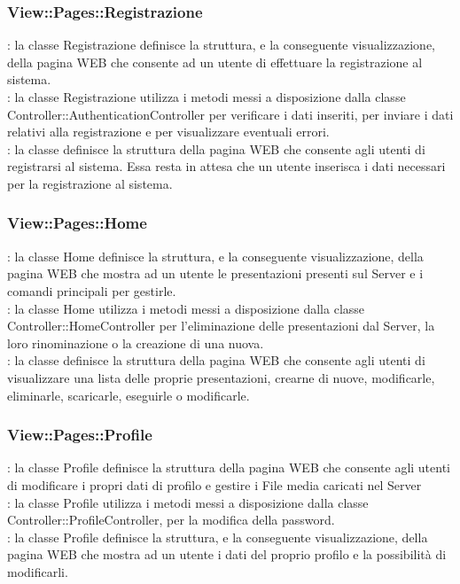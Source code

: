 {{		\subsubsection{View::\-Pages::\-Registrazione}{
			\textbf{\tipo}: la classe Registrazione definisce la struttura, e la conseguente visualizzazione, della pagina WEB che consente ad un utente di effettuare la registrazione al sistema.\\
			\textbf{\relaz}: la classe Registrazione utilizza i metodi messi a disposizione dalla classe Controller::\-AuthenticationController per verificare i dati inseriti, per inviare i dati relativi alla registrazione e per visualizzare eventuali errori.\\
			\textbf{\attivita}: la classe definisce la struttura della pagina WEB che consente agli utenti di registrarsi al sistema. Essa resta in attesa che un utente inserisca i dati necessari per la registrazione al sistema.
		}
		\subsubsection{View::\-Pages::\-Home}{
			\textbf{\tipo}: la classe Home definisce la struttura, e la conseguente visualizzazione, della pagina WEB che mostra ad un utente le presentazioni presenti sul Server e i comandi principali per gestirle.\\	
			\textbf{\relaz}: la classe Home utilizza i metodi messi a disposizione dalla classe Controller::\-HomeController per l'eliminazione delle presentazioni dal Server, la loro rinominazione o la creazione di una nuova.\\
			\textbf{\attivita}: la classe definisce la struttura della pagina WEB che consente agli utenti di visualizzare una lista delle proprie presentazioni, crearne di nuove, modificarle, eliminarle, scaricarle, eseguirle o modificarle.
		}
		\subsubsection{View::\-Pages::\-Profile}{
			\textbf{\tipo}: la classe Profile definisce la struttura della pagina WEB che consente agli utenti di modificare i propri dati di profilo e gestire i File media caricati nel Server \\
			\textbf{\relaz}: la classe Profile utilizza i metodi messi a disposizione dalla classe Controller::\-ProfileController, per la modifica della password.\\
			\textbf{\attivita}: la classe Profile definisce la struttura, e la conseguente visualizzazione, della pagina WEB che mostra ad un utente i dati del proprio profilo e la possibilità di modificarli.
		}
}}
